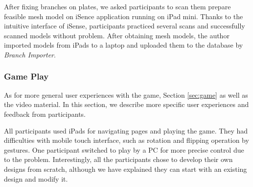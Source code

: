 After fixing branches on plates, we asked participants to scan them prepare feasible mesh model on iSence application running on iPad mini.
Thanks to the intuitive interface of iSense, participants practiced several scans and successfully scanned models without problem.
After obtaining mesh models, the author imported models from iPads to a laptop and uploaded them to the database by \textit{Branch Importer}.



\subsubsection*{Game Play}
As for more general user experiences with the game, Section \ref{sec:game} as well as the video material.
In this section, we describe more specific user experiences and feedback from participants.

All participants used iPads for navigating pages and playing the game.
They had difficulties with mobile touch interface, such as rotation and flipping operation by gestures.
One participant switched to play by a PC for more precise control due to the problem.
Interestingly, all the participants chose to develop their own designs from scratch, although we have explained they can start with an existing design and modify it.

